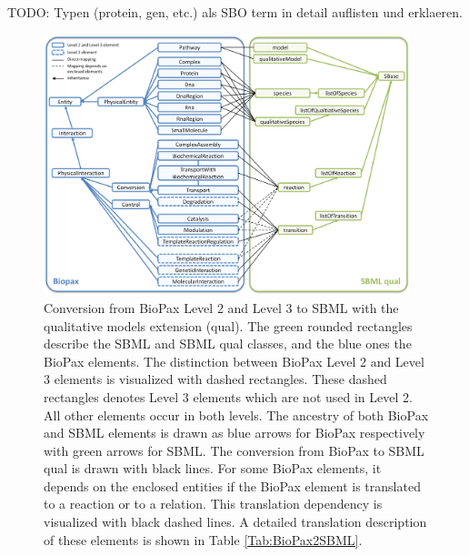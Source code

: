 \documentclass{bioinfo}
\begin{document}
\begin{methods}
TODO: Typen (protein, gen, etc.) als SBO term in detail auflisten und erklaeren.
\begin{figure}[t!h]
\centering \includegraphics[width=0.95\textwidth]{BioPaxSBMLqual.png}
\caption{Conversion from BioPax Level 2 and Level 3 to SBML with the qualitative models extension (qual). 
The green rounded rectangles describe the SBML and SBML qual classes, and the blue ones the BioPax elements. 
The distinction between BioPax Level 2 and Level 3 elements is visualized with dashed rectangles. 
These dashed rectangles denotes Level 3 elements which are not used in Level 2. 
All other elements occur in both levels. 
The ancestry of both BioPax and SBML elements is drawn as blue arrows for BioPax respectively with green arrows for SBML. 
The conversion from BioPax to SBML qual is drawn with black lines. 
For some BioPax elements, it depends on the enclosed entities if the BioPax element is translated to a reaction or to a relation. 
This translation dependency is visualized with black dashed lines. 
A detailed translation description of these elements is shown in Table \ref{Tab:BioPax2SBML}.}
\label{fig:BioPaxSBMLqual}
\end{figure}


\end{methods}
\end{document}
